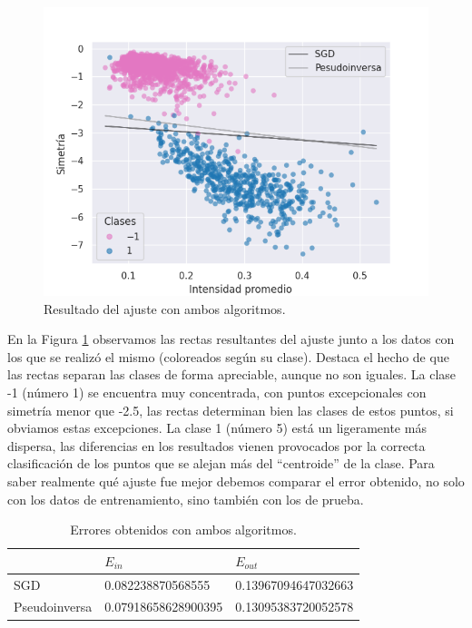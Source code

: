 \documentclass[a4paper, 20pt]{article}
\begin{document}
\begin{figure}[H]
    \centering
    \includegraphics[width=1\textwidth]{results2}
    \caption{Resultado del ajuste con ambos algoritmos.}
    \label{fig:2c}
\end{figure}

En la Figura \ref{fig:2c} observamos las rectas resultantes del ajuste junto a los datos con los que se realizó el mismo (coloreados según su clase). Destaca el hecho de que las rectas separan las clases de forma apreciable, aunque no son iguales. La clase -1 (número 1) se encuentra muy concentrada, con puntos excepcionales con simetría menor que -2.5, las rectas determinan bien las clases de estos puntos, si obviamos estas excepciones. La clase 1 (número 5) está un ligeramente más dispersa, las diferencias en los resultados vienen provocados por la correcta clasificación de los puntos que se alejan más del ``centroide'' de la clase. Para saber realmente qué ajuste fue mejor debemos comparar el error obtenido, no solo con los datos de entrenamiento, sino también con los de prueba.

\begin{table}[H]
\large
\centering
\caption{Errores obtenidos con ambos algoritmos.}
\label{tab:21}
\begin{tabular}{lll}
\toprule
 & $E_{in}$ & $E_{out}$ \\ \midrule
SGD & 0.082238870568555 & 0.13967094647032663 \\
Pseudoinversa & 0.07918658628900395 & 0.13095383720052578 \\
\bottomrule
\end{tabular}
\end{table}
\end{document}
